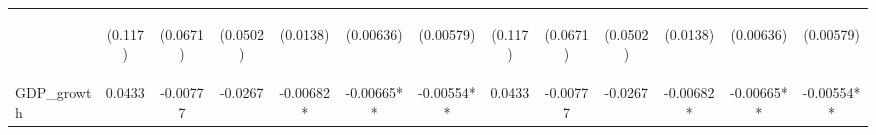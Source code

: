 \documentclass[]{article}
\begin{document}
\begin{center}
\begin{tabular}{lcccccccccccc}
\vspace{4pt} & \begin{footnotesize}(0.117)\end{footnotesize} & \begin{footnotesize}(0.0671)\end{footnotesize} & \begin{footnotesize}(0.0502)\end{footnotesize} & \begin{footnotesize}(0.0138)\end{footnotesize} & \begin{footnotesize}(0.00636)\end{footnotesize} & \begin{footnotesize}(0.00579)\end{footnotesize} & \begin{footnotesize}(0.117)\end{footnotesize} & \begin{footnotesize}(0.0671)\end{footnotesize} & \begin{footnotesize}(0.0502)\end{footnotesize} & \begin{footnotesize}(0.0138)\end{footnotesize} & \begin{footnotesize}(0.00636)\end{footnotesize} & \begin{footnotesize}(0.00579)\end{footnotesize} \\
GDP\_growth & 0.0433 & -0.00777 & -0.0267 & -0.00682* & -0.00665** & -0.00554** & 0.0433 & -0.00777 & -0.0267 & -0.00682* & -0.00665** & -0.00554** \\

\end{tabular}
\end{center}
\end{document}
